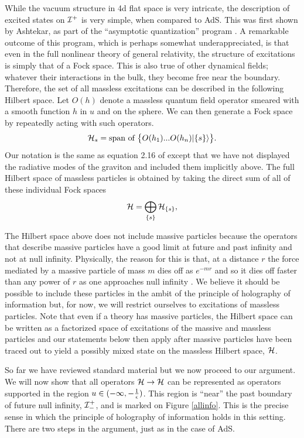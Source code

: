 \documentclass[12pt]{article}
\def\hilb[#1]{{\cal H}_{#1}}
\newcommand{\be}{\begin{equation}}
\newcommand{\ee}{\end{equation}}
\def \scrip{{\cal I}^{+}}
\def \scrippast{{\cal I}^{+}_{-}}
\def\supcharge[#1]{\{#1\}}
\begin{document}
While the vacuum structure in 4d flat space is very intricate, the description of excited states on $\scrip$ is very simple, when compared to AdS. This was first shown by Ashtekar, as part of the ``asymptotic quantization'' program  \cite{Ashtekar:1981sf,Ashtekar:1981hw,Ashtekar:1987tt,Ashtekar:2018lor}. A remarkable outcome of this program, which is perhaps somewhat underappreciated, is that even in the full nonlinear theory of general relativity, the structure of excitations is simply that of a Fock space. This is also true of other dynamical fields; whatever their interactions in the bulk, they become free near the boundary. Therefore,
the set of all massless excitations can be described in the following Hilbert space.  Let $O(h)$ denote a massless quantum field operator smeared with a smooth function $h$ in $u$ and on the sphere. We can then generate a Fock space by repeatedly acting with such operators.
\be
\label{hilbsexc}
\hilb[s] = \text{span~of~}\big\{O(h_1) ... O(h_n) | \{s \} \rangle \big\}.
\ee
Our notation is the same as equation 2.16 of \cite{Laddha:2020kvp} except that we have not displayed the radiative modes of the graviton and included them implicitly above. The full Hilbert space of massless particles is obtained by taking the direct sum of all of these individual Fock spaces
\be
\label{hfulldef}
{\cal H} = \bigoplus_{\supcharge[s]} {\cal H}_{\supcharge[s]},
\ee

The Hilbert space above does not include massive particles because the operators that describe massive particles have a good limit at future and past infinity and not at null infinity. Physically, the reason for this is that, at a distance $r$ the force mediated by a massive particle of mass $m$ dies off as $e^{-m r}$ and so it dies off faster than any power of $r$ as one approaches null infinity \cite{winicour1988massive}. We believe it should be possible to include these particles in the ambit of the principle of holography of information but, for now, we will restrict ourselves to excitations of massless particles. Note that even if a theory has massive particles, the Hilbert space can be written as a factorized space of excitations of the massive and massless particles \cite{Campiglia:2015kxa} and our statements below then apply after massive particles have been traced out to yield a possibly mixed state on the massless Hilbert space, ${\cal H}$.



So far we have reviewed standard material but we now proceed to our argument. We will now show that all operators ${\cal H} \rightarrow {\cal H}$ can be represented as operators supported in the region $u \in (-\infty, -{1 \over \epsilon})$. This region is ``near'' the past boundary of future null infinity,  $\scrippast$, and is marked on  Figure \ref{allinfo}. This is the precise sense in which the principle of holography of information holds in this setting. There are two steps in the argument, just as in the case of AdS. 
\end{document}
